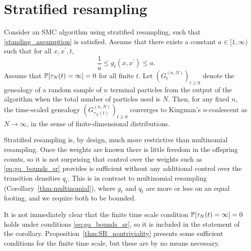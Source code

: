 \section{Stratified resampling \seb{$\checkmark$} }

\begin{corollary}\label{thm:stratified}
Consider an SMC algorithm using stratified resampling, such that \ref{standing_assumption} is satisfied.
Assume that there exists a constant $a\in [1,\infty)$ such that for all $x, x^\prime, t$,
\begin{equation}\label{eq:gq_bounds_sr}
\frac{1}{a} \leq g_t(x, x^\prime) \leq a .
\end{equation}
Assume that $\mathbb{P}[ \tau_N(t) = \infty] =0$ for all finite $t$.
Let $(G_t^{(n,N)})_{t\geq0}$ denote the genealogy of a random sample of $n$ terminal particles from the output of the algorithm when the total number of particles used is $N$. Then, for any fixed $n$, the time-scaled genealogy $(G_{\tau_N(t)}^{(n,N)})_{t\geq0}$ converges to Kingman's $n$-coalescent as $N\to \infty$, in the sense of finite-dimensional distributions.
\end{corollary}
Stratified resampling is, by design, much more restrictive than multinomial resampling. Once the weights are known there is little freedom in the offspring counts, so it is not surprising that control over the weights such as \eqref{eq:gq_bounds_sr} provides is sufficient without any additional control over the transition densities $q_t$. This is in contrast to multinomial resampling (Corollary~\ref{thm:multinomial}), where $g_t$ and $q_t$ are more or less on an equal footing, and we require both to be bounded.

It is not immediately clear that the finite time scale condition $\mathbb{P}[ \tau_N(t) = \infty] =0$ holds under conditions \eqref{eq:gq_bounds_sr}, so it is included in the statement of the corollary. Proposition~\ref{thm:SR_nontriviality} presents some sufficient conditions for the finite time scale, but these are by no means necessary.


